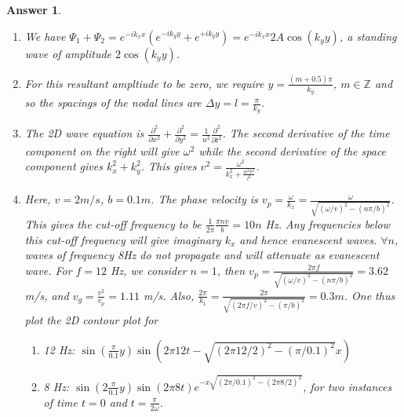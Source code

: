 \documentclass[a4paper]{article}
\newtheorem{ans}{Answer}[section]
\theoremstyle{new}
\begin{document}
\begin{ans}\leavevmode
\begin{enumerate}[label=(\alph*)]
\item We have $\Psi_1+\Psi_2=e^{-ik_xx}(e^{-ik_yy}+e^{+ik_yy})=e^{-ik_xx}2A\cos(k_yy)$, a standing wave of amplitude $2\cos(k_yy)$.
\item For this resultant ampltiude to be zero, we require $y=\frac{(m+0.5)\pi}{k_y}$, $m\in\mathbb{Z}$ and so the spacings of the nodal lines are $\Delta y=l=\frac{\pi}{k_y}$.
\item The 2D wave equation is $\frac{\partial^2}{\partial x^2}+\frac{\partial^2}{\partial y^2}=\frac{1}{u^2}\frac{\partial^2}{\partial t^2}$. The second derivative of the time component on the right will give $\omega^2$ while the second derivative of the space component gives $k_x^2+k_y^2$. This gives $v^2=\frac{\omega^2}{k_x^2+\frac{n^2\pi^2}{l^2}}$.
\item Here, $v=2m/s$, $b=0.1m$. The phase velocity is $v_p=\frac{\omega}{k_x}=\frac{\omega}{\sqrt{(\omega/v)^2-(n\pi/b)^2}}$. This gives the cut-off frequency to be $\frac{1}{2\pi}\frac{\pi nv}{b}=10n$ Hz. Any frequencies below this cut-off frequency will give imaginary $k_x$ and hence evanescent waves. $\forall n$, waves of frequency 8Hz do not propagate and will attenuate as evanescent wave. For $f=12$ Hz, we consider $n=1$, then $v_p=\frac{2\pi f}{\sqrt{(\omega/v)^2-(n\pi/b)^2}}=3.62$ m/s, and $v_g=\frac{v^2}{v_p}=1.11$ m/s. Also, $\frac{2\pi}{k_1}=\frac{2\pi}{\sqrt{(2\pi f/v)^2-(\pi/b)^2}}=0.3m$. One thus plot the 2D contour plot for
\begin{enumerate}[label=(\roman*)]
\item 12 Hz: $\sin(\frac{\pi}{0.1}y)\sin(2\pi 12 t-\sqrt{(2\pi 12/2)^2-(\pi /0.1)^2}x)$ 
\item 8 Hz: $\sin(2\frac{\pi}{0.1}y)\sin(2\pi 8t)e^{-x\sqrt{(2\pi /0.1)^2-(2\pi 8/2)^2}}$, for two instances of time $t=0$ and $t=\frac{\pi}{2\omega}$.
\end{enumerate}
\end{enumerate}
\end{ans}
\end{document}
